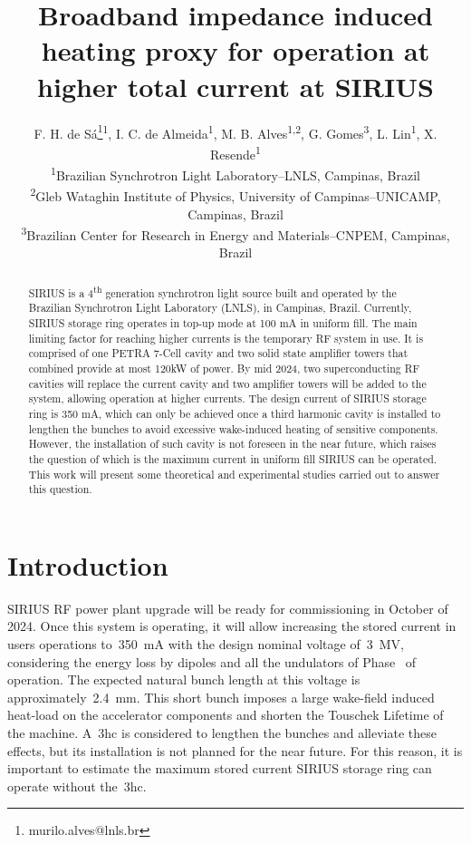 \documentclass
[
    a4paper,
    biblatex,     %
]{jacow}
\newcommand*{\rom}[1]{\uppercase\expandafter{\romannumeral#1\relax}}
\begin{document}
\title{Broadband impedance induced heating proxy for operation at higher total current at SIRIUS}
\author
{
    F. H. de Sá\thanks{murilo.alves@lnls.br}\textsuperscript{1},
    I. C. de Almeida\textsuperscript{1},
    M. B. Alves\textsuperscript{1,2},
    G. Gomes\textsuperscript{3},
    L. Lin\textsuperscript{1},
    X. Resende\textsuperscript{1}\\
    \textsuperscript{1}Brazilian Synchrotron Light Laboratory--LNLS, Campinas, Brazil\\
    \textsuperscript{2}Gleb Wataghin Institute of Physics, University of Campinas--UNICAMP, Campinas, Brazil\\
    \textsuperscript{3}Brazilian Center for Research in Energy and Materials--CNPEM, Campinas, Brazil
}
\maketitle

\begin{abstract}
    SIRIUS is a 4\textsuperscript{th} generation synchrotron light source built and operated by the Brazilian Synchrotron Light Laboratory (LNLS), in Campinas, Brazil. Currently, SIRIUS storage ring operates in top-up mode at 100 mA in uniform fill. The main limiting factor for reaching higher currents is the temporary RF system in use. It is comprised of one PETRA 7-Cell cavity and two solid state amplifier towers that combined provide at most 120kW of power. By mid 2024, two superconducting RF cavities will replace the current cavity and two amplifier towers will be added to the system, allowing operation at higher currents. The design current of SIRIUS storage ring is 350 mA, which can only be achieved once a third harmonic cavity is installed to lengthen the bunches to avoid excessive wake-induced heating of sensitive components. However, the installation of such cavity is not foreseen in the near future, which raises the question of which is the maximum current in uniform fill SIRIUS can be operated. This work will present some theoretical and experimental studies carried out to answer this question.
\end{abstract} 

\section{Introduction}
    SIRIUS RF power plant upgrade will be ready for commissioning in October of 2024. Once this system is operating, it will allow increasing the stored current in users operations to~\SI{350}{\milli\ampere} with the design nominal voltage of~\SI{3}{\mega\volt}, considering the energy loss by dipoles and all the undulators of Phase~\rom{1} of operation. The expected natural bunch length at this voltage is approximately~\SI{2.4}{\milli\meter}. This short bunch imposes a large wake-field induced heat-load on the accelerator components and shorten the Touschek Lifetime of the machine. A~\gls{3hc} is considered to lengthen the bunches and alleviate these effects, but its installation is not planned for the near future. For this reason, it is important to estimate the maximum stored current SIRIUS storage ring can operate without the~\gls{3hc}.
\end{document}
